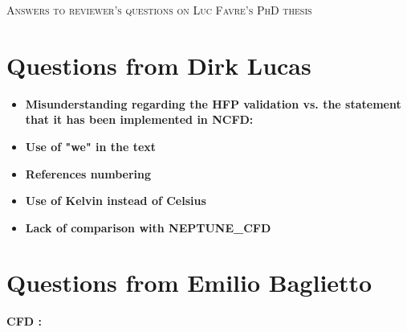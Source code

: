\documentclass[8pt, a4paper]{article}
\newcommand{\npar}{\vspace{\baselineskip}}
\begin{document}
{\centering

\Large{\textsc{Answers to reviewer's questions on Luc Favre's PhD thesis}}

}


\npar

\section{Questions from Dirk Lucas}

\begin{itemize}
\setlength{\itemsep}{45pt}
\item \textbf{Misunderstanding regarding the HFP validation vs. the statement that it has been implemented in NCFD:}

\item \textbf{Use of "we" in the text}


\item \textbf{References numbering}

\item \textbf{Use of Kelvin instead of Celsius}

\item \textbf{Lack of comparison with NEPTUNE\_CFD}

\end{itemize}


\clearpage

\section{Questions from Emilio Baglietto}

\textbf{CFD : }
\end{document}
